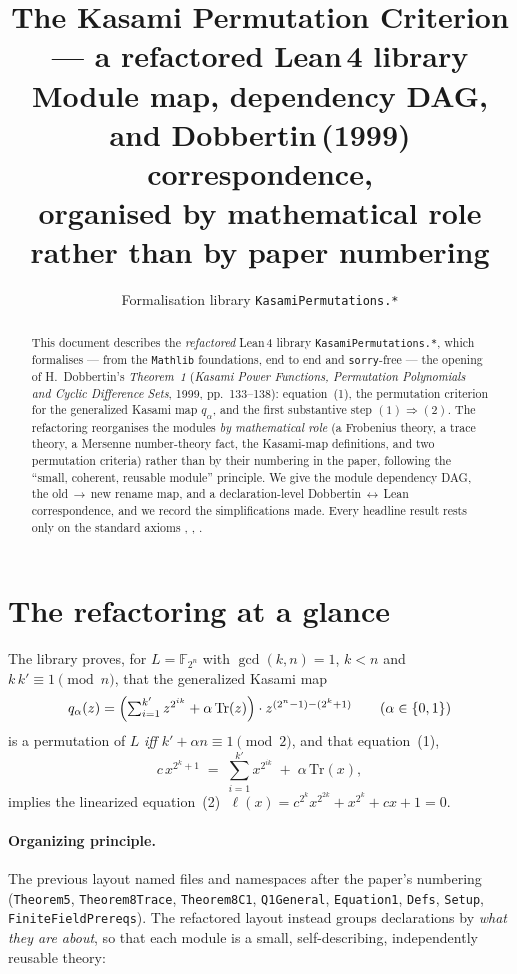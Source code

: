 \documentclass[11pt]{article}
\title{\textbf{The Kasami Permutation Criterion --- a refactored Lean\,4 library}\\[4pt]
\large Module map, dependency DAG, and Dobbertin\,(1999) correspondence,\\[2pt]
\normalsize organised by mathematical role rather than by paper numbering}
\author{Formalisation library \texttt{KasamiPermutations.*}}
\date{}
\theoremstyle{definition}
\begin{document}
\maketitle

\begin{abstract}
\noindent
This document describes the \emph{refactored} Lean\,4 library
\texttt{KasamiPermutations.*}, which formalises --- from the \texttt{Mathlib}
foundations, end to end and \texttt{sorry}-free --- the opening of
H.~Dobbertin's \emph{Theorem~1} (\emph{Kasami Power Functions, Permutation
Polynomials and Cyclic Difference Sets}, 1999, pp.~133--138): equation~(1), the
permutation criterion for the generalized Kasami map $q_\alpha$, and the first
substantive step $(1)\Rightarrow(2)$.  The refactoring reorganises the modules
\emph{by mathematical role} (a Frobenius theory, a trace theory, a Mersenne
number-theory fact, the Kasami-map definitions, and two permutation criteria)
rather than by their numbering in the paper, following the ``small, coherent,
reusable module'' principle.  We give the module dependency DAG, the
old\,$\to$\,new rename map, and a declaration-level Dobbertin\,$\leftrightarrow$\,Lean
correspondence, and we record the simplifications made.  Every headline result
rests only on the standard axioms , ,
.
\end{abstract}

\tableofcontents
\bigskip

\section{The refactoring at a glance}

The library proves, for $L=\mathbb F_{2^n}$ with $\gcd(k,n)=1$, $k<n$ and
$k\,k'\equiv 1\pmod n$, that the generalized Kasami map
\[
   q_\alpha(z)=\Bigl(\textstyle\sum_{i=1}^{k'} z^{2^{ik}}+\alpha\,\mathrm{Tr}(z)\Bigr)
   \cdot z^{(2^n-1)-(2^k+1)}
   \qquad(\alpha\in\{0,1\})
\]
is a permutation of $L$ \emph{iff} $k'+\alpha n\equiv 1\pmod 2$, and that
equation~(1),
\[
   c\,x^{2^k+1} \;=\; \sum_{i=1}^{k'} x^{2^{ik}} \;+\; \alpha\,\mathrm{Tr}(x),
   \tag{1}
\]
implies the linearized equation~(2)
$\;\ell(x)=c^{2^k}x^{2^{2k}}+x^{2^k}+cx+1=0$.

\paragraph{Organizing principle.}
The previous layout named files and namespaces after the paper's numbering
(\texttt{Theorem5}, \texttt{Theorem8Trace}, \texttt{Theorem8C1},
\texttt{Q1General}, \texttt{Equation1}, \texttt{Defs}, \texttt{Setup},
\texttt{FiniteFieldPrereqs}).  The refactored layout instead groups declarations
by \emph{what they are about}, so that each module is a small, self-describing,
independently reusable theory:
\end{document}
